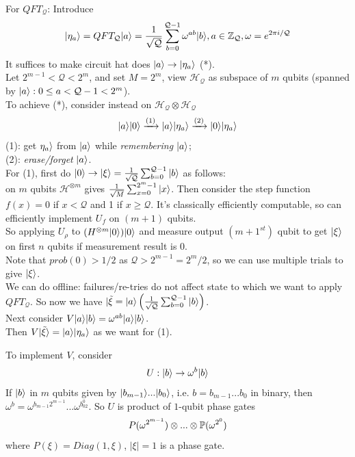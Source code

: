 \documentclass[a4paper]{article}
\begin{document}
For $QFT_{\mathcal{Q}}$: Introduce
$$|\eta_a \ket = QFT_{\mathcal{Q}} |a\ket = \frac{1}{\sqrt{\mathcal{Q}}} \sum_{b=0}^{\mathcal{Q}-1} \omega^{ab} |b\ket, a \in \Z_{\mathcal{Q}}, \omega = e^{2\pi i/\mathcal{Q}}$$
It suffices to make circuit hat does $|a \ket \to |\eta_a\ket$ (*).\\
Let $2^{m-1} < \mathcal{Q} < 2^m$, and set $M=2^m$, view $\mathcal{H}_{\mathcal{Q}}$ as subspace of $m$ qubits (spanned by $|a\ket: 0 \leq a < \mathcal{Q}-1 < 2^m$).\\
To achieve (*), consider instead on $\mathcal{H}_{\mathcal{Q}} \otimes \mathcal{H}_{\mathcal{Q}}$
$$|a\ket |0\ket \xrightarrow{(1)} |a\ket |\eta_a\ket \xrightarrow{(2)} |0\ket |\eta_a\ket$$
(1): get $\eta_a\ket$ from $|a\ket$ while \emph{remembering} $|a \ket$;\\
(2): \emph{erase/forget} $|a\ket$.\\
For (1), first do $|0\ket \to |\xi\ket = \frac{1}{\sqrt{\mathcal{Q}}} \sum_{b=0}^{\mathcal{Q}-1} |b\ket$ as follows:\\
on $m$ qubits $\mathcal{H}^{\otimes m}$ gives $\frac{1}{\sqrt{M}} \sum_{x=0}^{2^m-1} |x\ket$. Then consider the step function $f(x) = 0$ if $x<\mathcal{Q}$ and 1 if $x \geq \mathcal{Q}$. It's classically efficiently computable, so can efficiently implement $U_f$ on $(m+1)$ qubits.\\
So applying $U_\rho$ to $(H^{\otimes m} |0\ket) |0\ket$ and measure output $(m+1^{st})$ qubit to get $|\xi\ket$ on first $n$ qubits if measurement result is 0.\\
Note that $prob(0) > 1/2$ as $\mathcal{Q} > 2^{m-1} = 2^m / 2$, so we can use multiple trials to give $|\xi\ket$.\\
We can do offline: failures/re-tries do not affect state to which we want to apply $QFT_{\mathcal{Q}}$. So now we have $|\tilde{\xi} = |a\ket \left(\frac{1}{\sqrt{\mathcal{Q}}} \sum_{b=0}^{\mathcal{Q}-1} |b\ket\right)$.\\
Next consider $V |a\ket |b\ket = \omega^{ab} |a\ket |b\ket$.\\
Then $V|\tilde{\xi} \ket = |a\ket |\eta_a\ket$ as we want for (1).

To implement $V$, consider 
$$U:|b\ket \to \omega^b |b\ket$$
If $|b\ket$ in $m$ qubits given by $|b_{m-1} \ket ... |b_0\ket$, i.e. $b = b_{m-1} ... b_0$ in binary, then $\omega^b = \omega^{b_{m-1} 2^{m-1}}...\omega^{b_02^0}$. So $U$ is product of $1$-qubit phase gates
$$P(\omega^{2^{m-1}}) \otimes ... \otimes \P(\omega^{2^0})$$
where $P(\xi) = Diag(1,\xi)$, $|\xi|=1$ is a phase gate.
\end{document}
